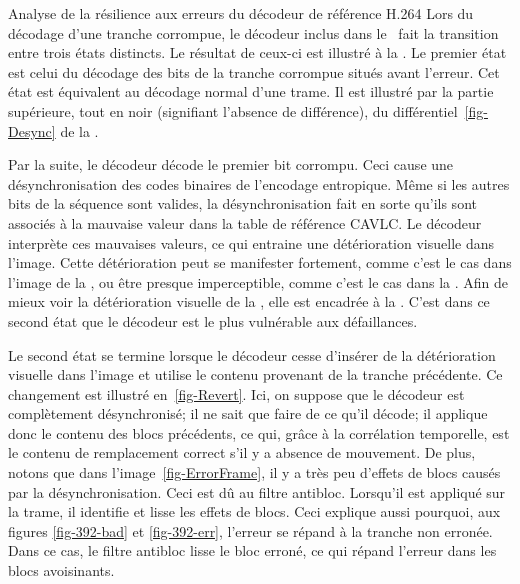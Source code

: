 \begin{section}{Analyse de la résilience aux erreurs du décodeur de référence H.264}
Lors du décodage d'une tranche corrompue, le décodeur inclus dans le
\ltCodec~fait la transition entre trois états distincts. Le résultat de ceux-ci
est illustré à la . Le premier état est celui du
décodage des bits de la tranche corrompue situés avant l'erreur. Cet état est
équivalent au décodage normal d'une trame. Il est illustré par la partie
supérieure, tout en noir (signifiant l'absence de différence), du
différentiel~\ref{fig-Desync} de la .

Par la suite, le décodeur décode le premier bit corrompu. Ceci cause une
désynchronisation des codes binaires de l'encodage entropique. Même si les
autres bits de la séquence sont valides, la désynchronisation fait en sorte
qu'ils sont associés à la mauvaise valeur dans la table de référence CAVLC. Le
décodeur interprète ces mauvaises valeurs, ce qui entraine une détérioration
visuelle dans l'image. Cette détérioration peut se manifester fortement, comme
c'est le cas dans l'image de la , ou être presque
imperceptible, comme c'est le cas dans la . Afin de mieux
voir la détérioration visuelle de la , elle est encadrée à
la . C'est dans ce second état que le décodeur est le plus
vulnérable aux défaillances.

Le second état se termine lorsque le décodeur cesse d'insérer de la
détérioration visuelle dans l'image et utilise le contenu provenant de la
tranche précédente. Ce changement est illustré en~\ref{fig-Revert}. Ici, on
suppose que le décodeur est complètement désynchronisé; il ne sait que faire de
ce qu'il décode; il applique donc le contenu des blocs précédents, ce qui, grâce
à la corrélation temporelle, est le contenu de remplacement correct s'il y a
absence de mouvement. De plus, notons que dans l'image~\ref{fig-ErrorFrame}, il
y a très peu d'effets de blocs causés par la désynchronisation. Ceci est dû au
filtre antibloc. Lorsqu'il est appliqué sur la trame, il identifie et lisse les
effets de blocs. Ceci explique aussi pourquoi, aux figures \ref{fig-392-bad} et
\ref{fig-392-err}, l'erreur se répand à la tranche non erronée. Dans ce cas, le
filtre antibloc lisse le bloc erroné, ce qui répand l'erreur dans les blocs
avoisinants.

\FloatBarrier
\end{section}


